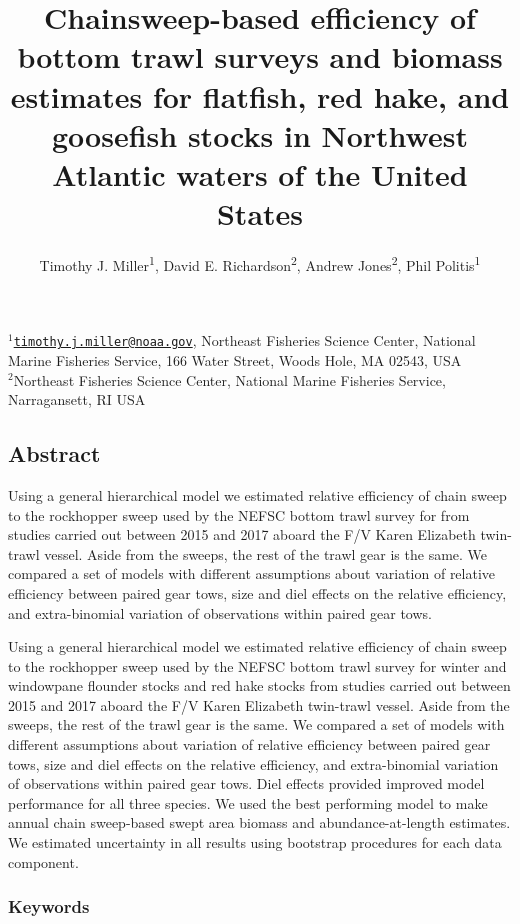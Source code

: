 \documentclass[]{article}
\title{Chainsweep-based efficiency of bottom trawl surveys and biomass
estimates for flatfish, red hake, and goosefish stocks in Northwest
Atlantic waters of the United States}
\author{Timothy J. Miller\textsuperscript{1}, David E.
Richardson\textsuperscript{2}, Andrew Jones\textsuperscript{2}, Phil
Politis\textsuperscript{1}}
\date{}
\begin{document}
\maketitle

\(^1\)\href{mailto:timothy.j.miller@noaa.gov}{\nolinkurl{timothy.j.miller@noaa.gov}},
Northeast Fisheries Science Center, National Marine Fisheries Service,
166 Water Street, Woods Hole, MA 02543, USA\\
\(^2\)Northeast Fisheries Science Center, National Marine Fisheries
Service, Narragansett, RI USA\\

\pagebreak

\hypertarget{abstract}{%
\subsection*{Abstract}\label{abstract}}

Using a general hierarchical model we estimated relative efficiency of
chain sweep to the rockhopper sweep used by the NEFSC bottom trawl
survey for from studies carried out between 2015 and 2017 aboard the F/V
Karen Elizabeth twin-trawl vessel. Aside from the sweeps, the rest of
the trawl gear is the same. We compared a set of models with different
assumptions about variation of relative efficiency between paired gear
tows, size and diel effects on the relative efficiency, and
extra-binomial variation of observations within paired gear tows.

Using a general hierarchical model we estimated relative efficiency of
chain sweep to the rockhopper sweep used by the NEFSC bottom trawl
survey for winter and windowpane flounder stocks and red hake stocks
from studies carried out between 2015 and 2017 aboard the F/V Karen
Elizabeth twin-trawl vessel. Aside from the sweeps, the rest of the
trawl gear is the same. We compared a set of models with different
assumptions about variation of relative efficiency between paired gear
tows, size and diel effects on the relative efficiency, and
extra-binomial variation of observations within paired gear tows. Diel
effects provided improved model performance for all three species. We
used the best performing model to make annual chain sweep-based swept
area biomass and abundance-at-length estimates. We estimated uncertainty
in all results using bootstrap procedures for each data component.

\hypertarget{keywords}{%
\subsubsection*{Keywords}\label{keywords}}
\end{document}
